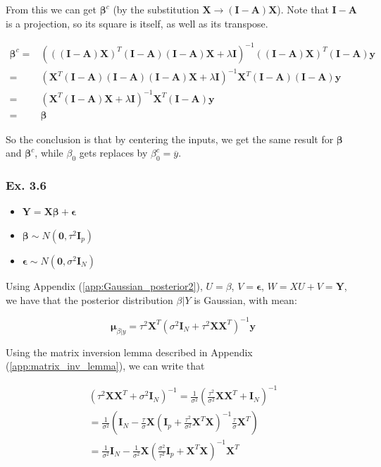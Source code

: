 \documentclass{article}
\begin{document}
From this we can get $\bm{\beta}^c$ (by the substitution $\mathbf{X} \to (\mathbf{I} - \mathbf{A})\mathbf{X}$). Note that $\mathbf{I} - \mathbf{A}$ is a projection, so its square is itself, as well as its transpose.

\[
\begin{split}
\bm{\beta}^c =& (((\mathbf{I} - \mathbf{A})\mathbf{X})^T(\mathbf{I} - \mathbf{A})(\mathbf{I} - \mathbf{A})\mathbf{X} + \lambda \mathbf{I})^{-1} ((\mathbf{I} - \mathbf{A})\mathbf{X})^T (\mathbf{I} - \mathbf{A})\mathbf{y}\\
=& (\mathbf{X}^T(\mathbf{I} - \mathbf{A})(\mathbf{I} - \mathbf{A})(\mathbf{I} - \mathbf{A})\mathbf{X} + \lambda \mathbf{I})^{-1} \mathbf{X}^T (\mathbf{I} - \mathbf{A})(\mathbf{I} - \mathbf{A})\mathbf{y}\\
=& (\mathbf{X}^T(\mathbf{I} - \mathbf{A})\mathbf{X} + \lambda \mathbf{I})^{-1} \mathbf{X}^T (\mathbf{I} - \mathbf{A})\mathbf{y}\\
=& \bm{\beta}
\end{split}
\]

So the conclusion is that by centering the inputs, we get the same result for $\bm{\beta}$ and $\bm{\beta}^c$, while $\beta_0$ gets replaces by $\beta^c_0 = \overline{y}$.

\subsubsection{Ex. 3.6}

\begin{itemize}
    \item $\bm{Y} = \bm{X}\bm{\beta} + \bm{\epsilon}$
    \item $\bm{\beta} \sim N(\bm{0}, \tau^2 \bm{I}_p)$
    \item $\bm{\epsilon} \sim N(\bm{0}, \sigma^2 \bm{I}_N)$
\end{itemize}

Using Appendix (\ref{app:Gaussian_posterior2}), $U=\beta$, $V=\bm{\epsilon}$, $W=XU+V=\bm{Y}$, we have that the posterior distribution $\beta | Y$ is Gaussian, with mean:

\[
\bm{\mu}_{\beta|y} = \tau^2 \bm{X}^T (\sigma^2 \bm{I}_N + \tau^2 \bm{X} \bm{X}^T)^{-1}\bm{y}
\]

Using the matrix inversion lemma described in Appendix (\ref{app:matrix_inv_lemma}), we can write that

\[
\begin{split}
(\tau^2\bm{X}\bm{X}^T + \sigma^2 \bm{I}_N)^{-1} = \frac{1}{\sigma^2}\left(\frac{\tau^2}{\sigma^2}\bm{X}\bm{X}^T + \bm{I}_N\right)^{-1}\\ =\frac{1}{\sigma^2}\left( \bm{I}_N - \frac{\tau}{\sigma} \bm{X}\left(\bm{I}_p + \frac{\tau^2}{\sigma^2}\bm{X}^T\bm{X}\right)^{-1}\frac{\tau}{\sigma}\bm{X}^T \right)\\
=\frac{1}{\sigma^2} \bm{I}_N - \frac{1}{\sigma^2} \bm{X}\left(\frac{\sigma^2}{\tau^2}\bm{I}_p + \bm{X}^T\bm{X}\right)^{-1}\bm{X}^T
\end{split}
\]
\end{document}
